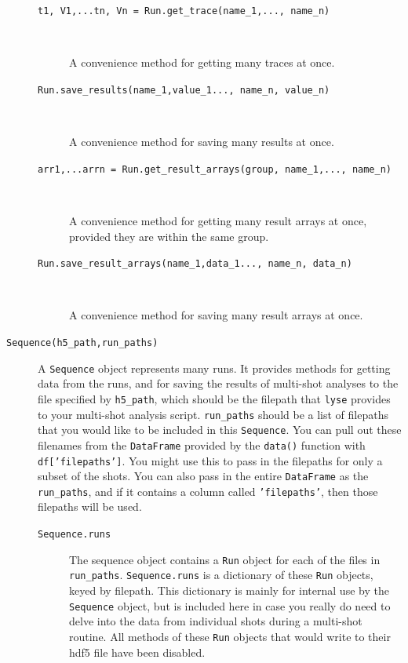 \documentclass[a4paper,11pt,titlepage]{article}
\begin{document}
\begin{description}
\begin{description}
\item[\texttt{t1, V1,...tn, Vn = Run.get\_trace(name\_1,..., name\_n)}]\ 

A convenience method for getting many traces at once.

\item[\texttt{Run.save\_results(name\_1,value\_1..., name\_n, value\_n)}]\ 

A convenience method for saving many results at once.

\item[\texttt{arr1,...arrn = Run.get\_result\_arrays(group, name\_1,..., name\_n)}]\ 

A convenience method for getting many result arrays at once, provided they are within the same group.

\item[\texttt{Run.save\_result\_arrays(name\_1,data\_1..., name\_n, data\_n)}]\ 

A convenience method for saving many result arrays at once.

\end{description}
\item[\texttt{Sequence(h5\_path,run\_paths)}] A \texttt{Sequence} object represents many runs. It provides methods for getting data from the runs, and for saving the results of multi-shot analyses to the file specified by \texttt{h5\_path}, which should be the filepath that \texttt{lyse} provides to your multi-shot analysis script. \texttt{run\_paths} should be a list of filepaths that you would like to be included in this \texttt{Sequence}. You can pull out these filenames from the \texttt{DataFrame} provided by the \texttt{data()} function with \texttt{df['filepaths']}. You might use this to pass in the filepaths for only a subset of the shots. You can also pass in the entire \texttt{DataFrame} as the \texttt{run\_paths}, and if it contains a column called \texttt{'filepaths'}, then those filepaths will be used.

\begin{description}
\item[\texttt{Sequence.runs}] The sequence object contains a \texttt{Run} object for each of the files in \texttt{run\_paths}.  \texttt{Sequence.runs} is a dictionary of these \texttt{Run} objects, keyed by filepath. This dictionary is mainly for internal use by the \texttt{Sequence} object, but is included here in case you really do need to delve into the data from individual shots during a multi-shot routine. All methods of these \texttt{Run} objects that would write to their hdf5 file have been disabled.


\end{description}
\end{description}
\end{document}
